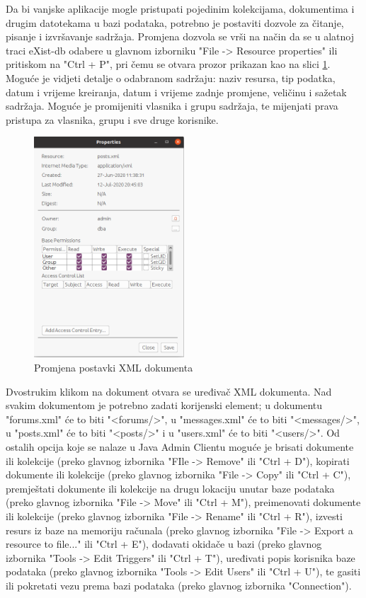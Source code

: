 \documentclass{foi}
\begin{document}
Da bi vanjske aplikacije mogle pristupati pojedinim kolekcijama, dokumentima i drugim datotekama u bazi podataka, potrebno je postaviti dozvole za čitanje, pisanje i izvršavanje sadržaja. Promjena dozvola se vrši na način da se u alatnoj traci eXist-db odabere u glavnom izborniku "File -> Resource properties" ili pritiskom na "Ctrl + P", pri čemu se otvara prozor prikazan kao na slici \ref{properties}. Moguće je vidjeti detalje o odabranom sadržaju: naziv resursa, tip podatka, datum i vrijeme kreiranja, datum i vrijeme zadnje promjene, veličinu i sažetak sadržaja. Moguće je promijeniti vlasnika i grupu sadržaja, te mijenjati prava pristupa za vlasnika, grupu i sve druge korisnike.

\begin{figure}[h!]
    \centering
    \includegraphics[width=0.5\textwidth]{slike/postavke-dokumenta.png}
    \caption{Promjena postavki XML dokumenta}
    \label{properties}
\end{figure}

Dvostrukim klikom na dokument otvara se uređivač XML dokumenta. Nad svakim dokumentom je potrebno zadati korijenski element; u dokumentu "forums.xml" će to biti "<forums/>", u "messages.xml" će to biti "<messages/>", u "posts.xml" će to biti "<posts/>" i u "users.xml" će to biti "<users/>". Od ostalih opcija koje se nalaze u Java Admin Clientu moguće je brisati dokumente ili kolekcije (preko glavnog izbornika "FIle -> Remove" ili "Ctrl + D"), kopirati dokumente ili kolekcije (preko glavnog izbornika "File -> Copy" ili "Ctrl + C"), premještati dokumente ili kolekcije na drugu lokaciju unutar baze podataka (preko glavnog izbornika "File -> Move" ili "Ctrl + M"), preimenovati dokumente ili kolekcije (preko glavnog izbornika "File -> Rename" ili "Ctrl + R"), izvesti resurs iz baze na memoriju računala (preko glavnog izbornika "File -> Export a resource to file..." ili "Ctrl + E"), dodavati okidače u bazi (preko glavnog izbornika "Tools -> Edit Triggers" ili "Ctrl + T"), uređivati popis korisnika baze podataka (preko glavnog izbornika "Tools -> Edit Users" ili "Ctrl + U"), te gasiti ili pokretati vezu prema bazi podataka (preko glavnog izbornika "Connection").  \cite{exist}
\end{document}
